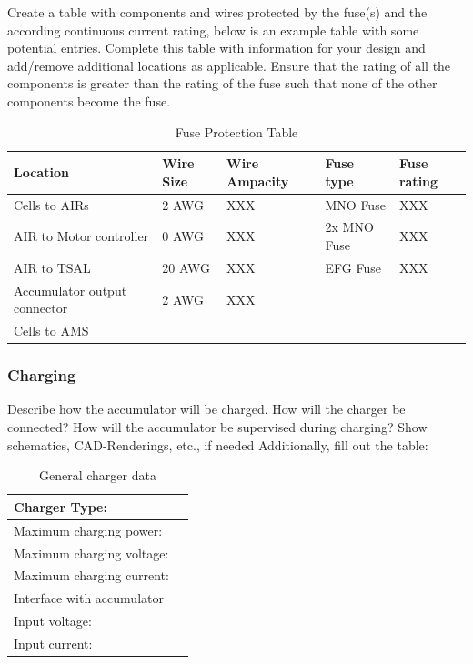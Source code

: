 Create a table with components and wires protected by the fuse(s) and the according continuous current rating, below is an example table with some potential entries.  Complete this table with information for your design and add/remove additional locations as applicable.  Ensure that the rating of all the components is greater than the rating of the fuse such that none of the other components become the fuse.

\begin{table}[H]
	\centering
	\caption{Fuse Protection Table}
	\begin{tabularx}{\textwidth}{|X|X|X|X|X|}
		\hline
		Location & Wire Size & Wire Ampacity & Fuse type & Fuse rating\\[\TableSize]
		\hline
		Cells to AIRs & 2 AWG & XXX & MNO Fuse & XXX \\[\TableSize]
		\hline
		AIR to Motor controller & 0 AWG & XXX & 2x MNO Fuse & XXX \\[\TableSize]
		\hline
		AIR to TSAL & 20 AWG & XXX & EFG Fuse & XXX \\[\TableSize]
		\hline
		Accumulator output connector & 2 AWG & XXX &     &  \\[\TableSize]
		\hline
		Cells to AMS &     &     &     &  \\[\TableSize]
		\hline
	\end{tabularx}%
	\label{tab:acc-fuse-protection}%
\end{table}%

\subsubsection{Charging}
Describe how the accumulator will be charged. How will the charger be connected? How will the accumulator be supervised during charging? Show schematics, CAD-Renderings, etc., if needed
Additionally, fill out the table:

\begin{table}[H]
	\centering
	\caption{General charger data}
	\begin{tabularx}{\textwidth}{|X|X|}
		\hline
		Charger Type: & \\[\TableSize]
		\hline
		Maximum charging power: &\\[\TableSize]
		\hline
		Maximum charging voltage: &  \\[\TableSize]
		\hline
		Maximum charging current: &  \\[\TableSize]
		\hline
		Interface with accumulator &  \\[\TableSize]
		\hline
		Input voltage: & \\[\TableSize]
		\hline
		Input current: &  \\[\TableSize]
		\hline
	\end{tabularx}%
	\label{tab:acc-charger}%
\end{table}%

